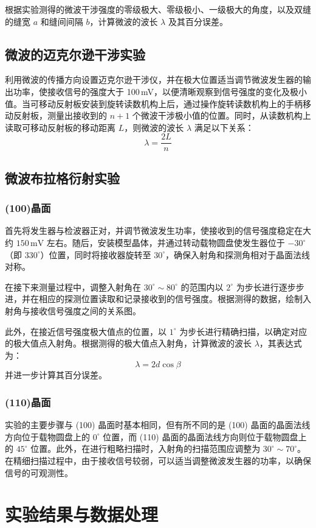 \documentclass[UTF-8,twoside,cs4size]{ctexart}
\begin{document}
根据实验测得的微波干涉强度的零级极大、零级极小、一级极大的角度，以及双缝的缝宽 $a$ 和缝间间隔 $b$，计算微波的波长 $\lambda$ 及其百分误差。
\subsection{微波的迈克尔逊干涉实验}
利用微波的传播方向设置迈克尔逊干涉仪，并在极大位置适当调节微波发生器的输出功率，使接收信号的强度大于 100\,mV，以便清晰观察到信号强度的变化及极小值。当可移动反射板安装到旋转读数机构上后，通过操作旋转读数机构上的手柄移动反射板，测量出接收到的 $n+1$ 个微波干涉极小值的位置。同时，从读数机构上读取可移动反射板的移动距离 $L$，则微波的波长 $\lambda$ 满足以下关系：
\[
\lambda = \frac{2L}{n}
\]
\subsection{微波布拉格衍射实验}
\subsubsection{(100)晶面}
首先将发生器与检波器正对，并调节微波发生功率，使接收到的信号强度稳定在大约 $150\,\mathrm{mV}$ 左右。随后，安装模型晶体，并通过转动载物圆盘使发生器位于 $-30^\circ$（即 $330^\circ$）位置，同时将接收器旋转至 $30^\circ$，确保入射角和探测角相对于晶面法线对称。

在接下来测量过程中，调整入射角在 $30^\circ \sim 80^\circ$ 的范围内以 $2^\circ$ 为步长进行逐步步进，并在相应的探测位置读取和记录接收到的信号强度。根据测得的数据，绘制入射角与接收信号强度之间的关系图。

此外，在接近信号强度极大值点的位置，以 $1^\circ$ 为步长进行精确扫描，以确定对应的极大值点入射角。根据测得的极大值点入射角，计算微波的波长 $\lambda$，其表达式为：
\[
\lambda = 2d \cos \beta
\]
并进一步计算其百分误差。
\subsubsection{(110)晶面}
实验的主要步骤与 (100) 晶面时基本相同，但有所不同的是 (100) 晶面的晶面法线方向位于载物圆盘上的 $0^\circ$ 位置，而 (110) 晶面的晶面法线方向则位于载物圆盘上的 $45^\circ$ 位置。此外，在进行粗略扫描时，入射角的扫描范围应调整为 $30^\circ \sim 70^\circ$。在精细扫描过程中，由于接收信号较弱，可以适当调整微波发生器的功率，以确保信号的可观测性。

\section{实验结果与数据处理}
\end{document}
